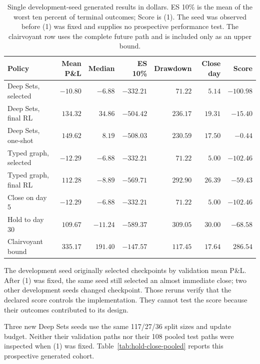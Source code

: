 \documentclass{strategynet-journal}
\begin{document}
\begin{table}[H]
\centering
\scriptsize
\begin{tabular}{lrrrrrr}
\toprule
Policy & Mean P\&L & Median & ES 10\% & Drawdown & Close day & Score \\
\midrule
Deep Sets, selected & \(-10.80\) & \(-6.88\) & \(-332.21\) & \(71.22\) & \(5.14\) & \(-100.98\) \\
Deep Sets, final RL & \(134.32\) & \(34.86\) & \(-504.42\) & \(236.17\) & \(19.31\) & \(-15.40\) \\
Deep Sets, one-shot & \(149.62\) & \(8.19\) & \(-508.03\) & \(230.59\) & \(17.50\) & \(-0.44\) \\
Typed graph, selected & \(-12.29\) & \(-6.88\) & \(-332.21\) & \(71.22\) & \(5.00\) & \(-102.46\) \\
Typed graph, final RL & \(112.28\) & \(-8.89\) & \(-569.71\) & \(292.90\) & \(26.39\) & \(-59.43\) \\
Close on day 5 & \(-12.29\) & \(-6.88\) & \(-332.21\) & \(71.22\) & \(5.00\) & \(-102.46\) \\
Hold to day 30 & \(109.67\) & \(-11.24\) & \(-589.37\) & \(309.05\) & \(30.00\) & \(-68.58\) \\
Clairvoyant bound & \(335.17\) & \(191.40\) & \(-147.57\) & \(117.45\) & \(17.64\) & \(286.54\) \\
\bottomrule
\end{tabular}
\caption{Single development-seed generated results in dollars.  ES 10\% is
the mean of the worst ten percent of terminal outcomes; Score is (1).
The seed was observed before (1) was fixed and supplies no prospective
performance test.  The clairvoyant row uses the complete future path and is
included only as an upper bound.}
\label{tab:hold-close-control}
\end{table}

The development seed originally selected checkpoints by validation mean
P\&L.  After (1) was fixed, the same seed still selected an almost immediate
close; two other development seeds changed checkpoint.  Those reruns verify
that the declared score controls the implementation.  They cannot test the
score because their outcomes contributed to its design.

Three new Deep Sets seeds use the same 117/27/36 split sizes and update
budget.  Neither their validation paths nor their 108 pooled test paths were
inspected when (1) was fixed.  Table~\ref{tab:hold-close-pooled} reports this
prospective generated cohort.
\end{document}
